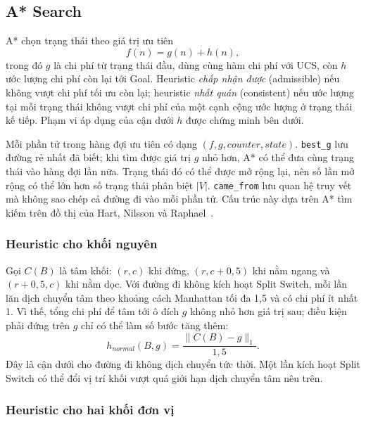 \subsection{A* Search}

A* chọn trạng thái theo giá trị ưu tiên
\begin{equation}
f(n)=g(n)+h(n),
\end{equation}
trong đó $g$ là chi phí từ trạng thái đầu, dùng cùng hàm chi phí với UCS, còn
$h$ ước lượng chi phí còn lại tới Goal. Heuristic \emph{chấp nhận được}
(admissible) nếu không vượt chi phí tối ưu còn lại; heuristic \emph{nhất quán}
(consistent) nếu ước lượng tại mỗi trạng thái không vượt chi phí của một cạnh
cộng ước lượng ở trạng thái kế tiếp. Phạm vi áp dụng của cận dưới $h$ được chứng
minh bên dưới.

Mỗi phần tử trong hàng đợi ưu tiên có dạng $(f,g,counter,state)$.
\texttt{best\_g} lưu đường rẻ nhất đã biết; khi tìm được giá trị $g$ nhỏ hơn,
A* có thể đưa cùng trạng thái vào hàng đợi lần nữa. Trạng thái đó có thể được
mở rộng lại, nên số lần mở rộng có thể lớn hơn số trạng thái phân biệt $|V|$.
\texttt{came\_from} lưu quan hệ truy vết mà không sao chép cả đường đi vào mỗi
phần tử. Cấu trúc này dựa trên A* tìm kiếm trên đồ thị của Hart, Nilsson và
Raphael~\cite{hart1968}.

\subsubsection{Heuristic cho khối nguyên}

Gọi $C(B)$ là tâm khối: $(r,c)$ khi đứng, $(r,c+0{,}5)$ khi nằm ngang và
$(r+0{,}5,c)$ khi nằm dọc. Với đường đi không kích hoạt Split Switch, mỗi
lần lăn dịch chuyển tâm theo khoảng cách Manhattan tối đa 1,5 và có chi phí
ít nhất 1. Vì thế, tổng chi phí để tâm tới ô đích $g$ không nhỏ hơn giá trị sau;
điều kiện phải đứng trên $g$ chỉ có thể làm số bước tăng thêm:
\begin{equation}
h_{normal}(B,g)=\frac{\lVert C(B)-g\rVert_1}{1{,}5}.
\end{equation}
Đây là cận dưới cho đường đi không dịch chuyển tức thời. Một lần kích hoạt
Split Switch có thể đổi vị trí khối vượt quá giới hạn dịch chuyển tâm nêu trên.

\subsubsection{Heuristic cho hai khối đơn vị}

